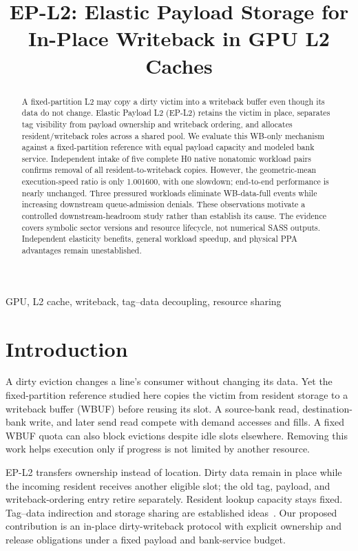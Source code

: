 \documentclass[conference,letterpaper]{IEEEtran}
\newcommand{\epl}{EP-L2}
\begin{document}
\title{EP-L2: Elastic Payload Storage for\\In-Place Writeback in GPU L2 Caches}
\author{}
\maketitle
\begin{abstract}
A fixed-partition L2 may copy a dirty victim into a writeback buffer even though its data do not change. Elastic Payload L2 (EP-L2) retains the victim in place, separates tag visibility from payload ownership and writeback ordering, and allocates resident/writeback roles across a shared pool. We evaluate this WB-only mechanism against a fixed-partition reference with equal payload capacity and modeled bank service. Independent intake of five complete H0 native nonatomic workload pairs confirms removal of all resident-to-writeback copies. However, the geometric-mean execution-speed ratio is only 1.001600, with one slowdown; end-to-end performance is nearly unchanged. Three pressured workloads eliminate WB-data-full events while increasing downstream queue-admission denials. These observations motivate a controlled downstream-headroom study rather than establish its cause. The evidence covers symbolic sector versions and resource lifecycle, not numerical SASS outputs. Independent elasticity benefits, general workload speedup, and physical PPA advantages remain unestablished.
\end{abstract}
\begin{IEEEkeywords}
GPU, L2 cache, writeback, tag--data decoupling, resource sharing
\end{IEEEkeywords}

\section{Introduction}
A dirty eviction changes a line's consumer without changing its data. Yet the fixed-partition reference studied here copies the victim from resident storage to a writeback buffer (WBUF) before reusing its slot. A source-bank read, destination-bank write, and later send read compete with demand accesses and fills. A fixed WBUF quota can also block evictions despite idle slots elsewhere. Removing this work helps execution only if progress is not limited by another resource.

\epl{} transfers ownership instead of location. Dirty data remain in place while the incoming resident receives another eligible slot; the old tag, payload, and writeback-ordering entry retire separately. Resident lookup capacity stays fixed. Tag--data indirection and storage sharing are established ideas~\cite{vway,unified,farkas,micache}. Our proposed contribution is an in-place dirty-writeback protocol with explicit ownership and release obligations under a fixed payload and bank-service budget.
\end{document}
